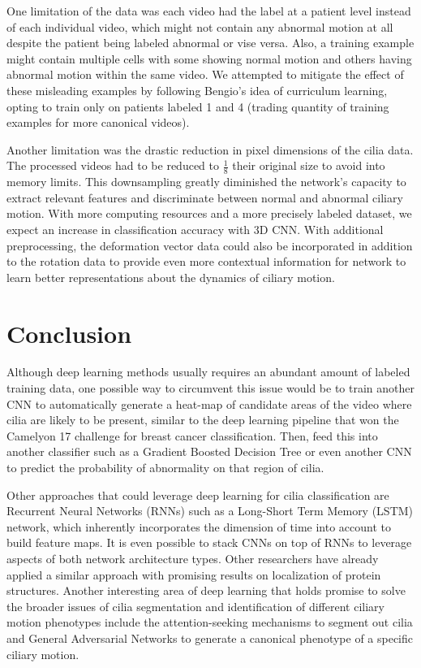 One limitation of the data was each video had the label at a patient level instead of each individual video, which might not contain any abnormal motion at all despite the patient being labeled abnormal or vise versa. Also, a training example might contain multiple cells with some showing normal motion and others having abnormal motion within the same video. We attempted to mitigate the effect of these misleading examples by following Bengio's \cite{bengio2009curriculum} idea of curriculum learning, opting to train only on patients labeled 1 and 4 (trading quantity of training examples for more canonical videos).

Another limitation was the drastic reduction in pixel dimensions of the cilia data. The processed videos had to be reduced to $\frac{1}{8}$ their original size to avoid into memory limits. This downsampling greatly diminished the network's capacity to extract relevant features and discriminate between normal and abnormal ciliary motion. With more computing resources and a more precisely labeled dataset, we expect an increase in classification accuracy with 3D CNN. With additional preprocessing, the deformation vector data could also be incorporated in addition to the rotation data to provide even more contextual information for network to learn better representations about the dynamics of ciliary motion.

\section{Conclusion}

Although deep learning methods usually requires an abundant amount of labeled training data, one possible way to circumvent this issue would be to train another CNN to automatically generate a heat-map of candidate areas of the video where cilia are likely to be present, similar to the deep learning pipeline \cite{wang2016deep} that won the Camelyon 17 challenge for breast cancer classification. Then, feed this into another classifier such as a Gradient Boosted Decision Tree or even another CNN to predict the probability of abnormality on that region of cilia.
 
Other approaches that could leverage deep learning for cilia classification are Recurrent Neural Networks (RNNs) such as a Long-Short Term Memory (LSTM) network, which inherently incorporates the dimension of time into account to build feature maps. It is even possible to stack CNNs on top of RNNs to leverage aspects of both network architecture types. Other researchers \cite{sonderby2015convolutional} have already applied a similar approach with promising results on localization of protein structures. Another interesting area of deep learning that holds promise to solve the broader issues of cilia segmentation and identification of different ciliary motion phenotypes include the attention-seeking mechanisms to segment out cilia and General Adversarial Networks to generate a canonical phenotype of a specific ciliary motion.

